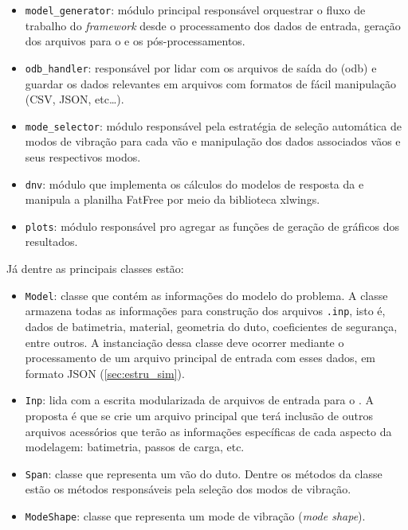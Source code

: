 \begin{itemize}
    \item \texttt{model\_generator}: módulo principal responsável orquestrar o fluxo de trabalho do \textit{framework}  desde o processamento dos dados de entrada, geração dos arquivos para o \abaqus e os pós-processamentos.

    \item \texttt{odb\_handler}: responsável por lidar com os arquivos de saída do \abaqus (odb) e guardar os dados relevantes em arquivos com formatos de fácil manipulação (CSV, JSON, etc\ldots).

    \item \texttt{mode\_selector}: módulo responsável pela estratégia de seleção automática de modos de vibração para cada vão e manipulação dos dados associados vãos e seus respectivos modos.

    \item \texttt{dnv}: módulo que implementa os cálculos do modelos de resposta da  e manipula a planilha FatFree por meio da biblioteca xlwings.

    \item \texttt{plots}: módulo responsável pro agregar as funções de geração de gráficos dos resultados.
\end{itemize}

Já dentre as principais classes estão:

\begin{itemize}
    \item \texttt{Model}: classe que contém as informações do modelo do problema.
    A classe armazena todas as informações para construção dos arquivos \texttt{.inp}, isto é, dados de batimetria, material, geometria do duto, coeficientes de segurança, entre outros.
    A instanciação dessa classe deve ocorrer mediante o processamento de um arquivo principal de entrada com esses dados, em formato JSON (\autoref{sec:estru_sim}).

    \item \texttt{Inp}: lida com a escrita modularizada de arquivos de entrada  para o \abaqus. A proposta é que se crie um arquivo principal que terá inclusão de outros arquivos acessórios que terão as informações específicas de cada aspecto da modelagem: batimetria, passos de carga, etc.

    \item \texttt{Span}: classe que representa um vão do duto. Dentre os métodos da classe estão os métodos responsáveis pela seleção dos modos de vibração.

    \item \texttt{ModeShape}: classe que representa um mode de vibração (\textit{mode shape}).
\end{itemize}

